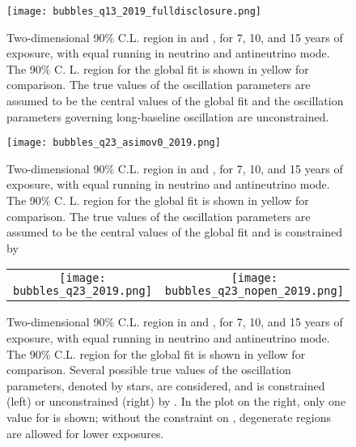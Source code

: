 \begin{figure}[h!]
    \centering
		\texttt{[image: bubbles\_q13\_2019\_fulldisclosure.png]}
	\caption[Two-dimensional 90\% C.L. region in  and \deltacp]{Two-dimensional 90\% C.L. region in  and \deltacp, for 7, 10, and 15 years of exposure, with equal running in neutrino and antineutrino mode. The 90\% C. L. region for the  global fit is shown in yellow for comparison. The true values of the oscillation parameters are assumed to be the central values of the  global fit and the oscillation parameters governing long-baseline oscillation are unconstrained.}
    \label{fig:res_th13vdcp}
\end{figure}

\begin{figure}[h!]
    \centering
		\texttt{[image: bubbles\_q23\_asimov0\_2019.png]}
	\caption[Two-dimensional 90\% C.L. region in  and \deltacp]{Two-dimensional 90\% C.L. region in  and \deltacp, for 7, 10, and 15 years of exposure, with equal running in neutrino and antineutrino mode. The 90\% C. L. region for the  global fit is shown in yellow for comparison. The true values of the oscillation parameters are assumed to be the central values of the  global fit and  is constrained by }
    \label{fig:res_th23vdcp}
\end{figure}

\begin{figure}[h!]
    \centering
    \begin{tabular}{cc}
		\texttt{[image: bubbles\_q23\_2019.png]} &
		\texttt{[image: bubbles\_q23\_nopen\_2019.png]} 
	\end{tabular}  
	\caption[Two-dimensional 90\% C.L. region in  and \deltacp]{Two-dimensional 90\% C.L. region in  and \deltacp, for 7, 10, and 15 years of exposure, with equal running in neutrino and antineutrino mode. The 90\% C.L. region for the  global fit is shown in yellow for comparison. Several possible true values of the oscillation parameters, denoted by stars, are considered, and  is constrained (left) or unconstrained (right) by . In the plot on the right, only one value for  is shown; without the constraint on , degenerate regions are allowed for lower exposures.}
    \label{fig:res_th23vdcp_degen}
\end{figure}

